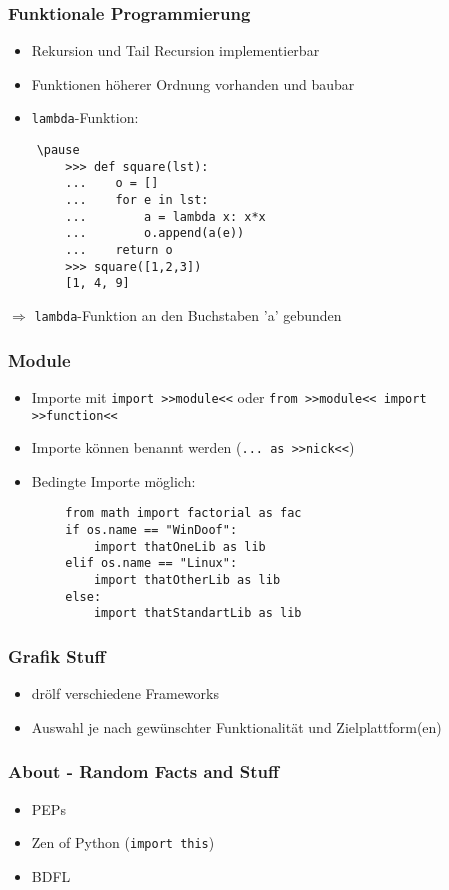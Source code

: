 \documentclass{beamer}
\begin{document}
\begin{frame}[fragile]
	\frametitle{Funktionale Programmierung}
	\begin{itemize}
		\item Rekursion und Tail Recursion implementierbar
		\item Funktionen höherer Ordnung vorhanden und baubar
		\item \texttt{lambda}-Funktion:
	\end{itemize}
	\begin{lstlisting}
	\pause
		>>> def square(lst):
		...    o = []
		...    for e in lst:
		...        a = lambda x: x*x
		...        o.append(a(e))
		...    return o
		>>> square([1,2,3])
		[1, 4, 9]
	\end{lstlisting}
	$\Rightarrow$ \texttt{lambda}-Funktion an den Buchstaben 'a' gebunden
\end{frame}

\begin{frame}[fragile]
	\frametitle{Module}
	\begin{itemize}
		\item Importe mit \texttt{import >>module<<} oder \texttt{from >>module<< import >>function<<}
		\item Importe können benannt werden (\texttt{... as >>nick<<})
		\item Bedingte Importe möglich:
	\end{itemize}
	\pause
	\begin{lstlisting}
		from math import factorial as fac
		if os.name == "WinDoof":
		    import thatOneLib as lib
		elif os.name == "Linux":
		    import thatOtherLib as lib
		else:
		    import thatStandartLib as lib
	\end{lstlisting}
\end{frame}

\begin{frame}
	\frametitle{Grafik Stuff}
	\begin{itemize}
		\item drölf verschiedene Frameworks
		\item Auswahl je nach gewünschter Funktionalität und Zielplattform(en)
	\end{itemize}
\end{frame}

\begin{frame}
	\frametitle{About - Random Facts and Stuff}
	\begin{itemize}
		\item PEPs
		\item Zen of Python (\texttt{import this})
		\item BDFL
	\end{itemize}
\end{frame}
	
\end{document}
